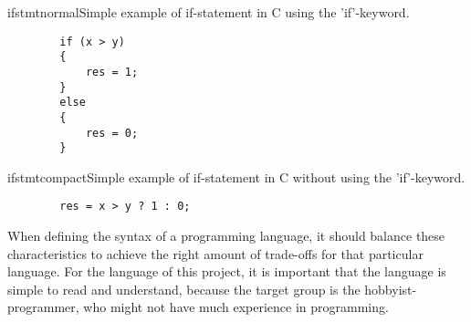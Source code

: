 \begin{code}{ifstmtnormal}{Simple example of if-statement in C using the 'if'-keyword.}
	\begin{lstlisting}
		if (x > y)
		{
    		res = 1;
		}
		else
		{
    		res = 0;
		}
	\end{lstlisting}
\end{code}

\begin{code}{ifstmtcompact}{Simple example of if-statement in C without using the 'if'-keyword.}
	\begin{lstlisting}
		res = x > y ? 1 : 0;
	\end{lstlisting}
\end{code}

When defining the syntax of a programming language, it should balance these characteristics to achieve the right amount of trade-offs for that particular language. For the language of this project, it is important that the language is simple to read and understand, because the target group is the hobbyist-programmer, who might not have much experience in programming.